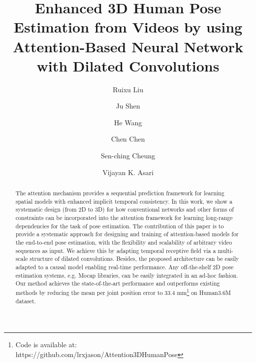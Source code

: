 \documentclass[twocolumn]{svjour3}          \smartqed  \usepackage{graphicx}
\begin{document}
\title{Enhanced 3D Human Pose Estimation from Videos by using Attention-Based Neural Network with Dilated Convolutions}





\author{
        Ruixu Liu \and
        Ju Shen \and
        He Wang \and
        Chen Chen \and
        Sen-ching Cheung \and
        Vijayan K. Asari
}









\maketitle
\begin{abstract}

The attention mechanism provides a sequential prediction framework for learning spatial models with enhanced implicit temporal consistency. In this work, we show a systematic design (from 2D to 3D) for how conventional networks and other forms of constraints can be incorporated into the attention framework for learning long-range dependencies for the task of pose estimation. The contribution of this paper is to provide a systematic approach for designing and training of attention-based models for the end-to-end pose estimation, with the flexibility and scalability of arbitrary video sequences as input. We achieve this by adapting temporal receptive field via a multi-scale structure of dilated convolutions.  Besides, the proposed architecture can be easily adapted to a causal model enabling real-time performance. Any off-the-shelf 2D pose estimation systems, e.g. Mocap libraries, can be easily integrated in an ad-hoc fashion. Our method achieves the state-of-the-art performance and outperforms existing methods by reducing the mean per joint position error to 33.4 mm\footnote{Code is available at:\\ https://github.com/lrxjason/Attention3DHumanPose} on Human3.6M dataset. 
\end{abstract}

\end{document}
